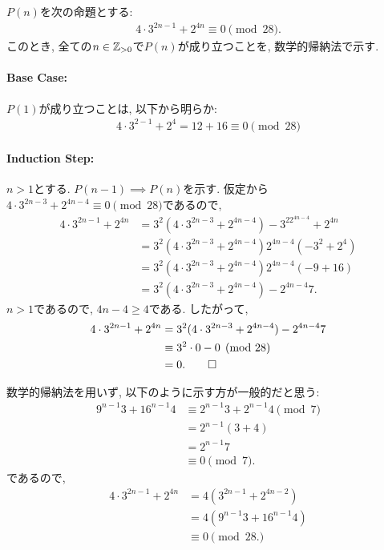 \begin{proof*}
  $P(n)$を次の命題とする:
  \begin{align*}
    4\cdot 3^{2n-1}+2^{4n}\equiv 0\pmod{28}
    .
  \end{align*}
  このとき,
  全ての$n\in\mathbb{Z}_{>0}$で$P(n)$が成り立つことを,
  数学的帰納法で示す.

  \paragraph{Base Case:}
  $P(1)$が成り立つことは, 以下から明らか:
  \begin{align*}
    4\cdot 3^{2-1}+2^{4}=12+16\equiv 0\pmod{28}
  \end{align*}

  \paragraph{Induction Step:}
  $n>1$とする.
  $P(n-1)\implies P(n)$を示す.
  仮定から$4\cdot 3^{2n-3}+2^{4n-4}\equiv 0\pmod{28}$であるので,
  \begin{align*}
    4\cdot 3^{2n-1}+2^{4n}
    &=3^2(4\cdot 3^{2n-3}+2^{4n-4})
    -3^22^{4n-4}+2^{4n}\\
    &=3^2(4\cdot 3^{2n-3}+2^{4n-4})
    2^{4n-4}(-3^2+2^{4})\\
    &=3^2(4\cdot 3^{2n-3}+2^{4n-4})
    2^{4n-4}(-9+16)\\
    &=3^2(4\cdot 3^{2n-3}+2^{4n-4})
    -2^{4n-4}7.
  \end{align*}
  $n>1$であるので, $4n-4\geq 4$である.
  したがって,
  \begin{align*}
    4\cdot 3^{2n-1}+2^{4n}
    &=3^2(4\cdot 3^{2n-3}+2^{4n-4})
    -2^{4n-4}7\\
    &\equiv 3^2\cdot 0-0\pmod{28}\\
    &=0
    .\qedhere
  \end{align*}
\end{proof*}

\begin{rem}
  数学的帰納法を用いず, 以下のように示す方が一般的だと思う:
  \begin{align*}
    9^{n-1}3+16^{n-1}4
    &\equiv 2^{n-1}3+2^{n-1}4 \pmod{7}\\
    &= 2^{n-1}(3+4)\\
    &= 2^{n-1}7\\
    &\equiv 0\pmod{7}.
  \end{align*}
  であるので,
  \begin{align*}
    4\cdot 3^{2n-1}+2^{4n}
    &=4(3^{2n-1}+2^{4n-2})\\
    &=4(9^{n-1}3+16^{n-1}4)\\
    &\equiv 0 \pmod{28.}
  \end{align*}
\end{rem}

